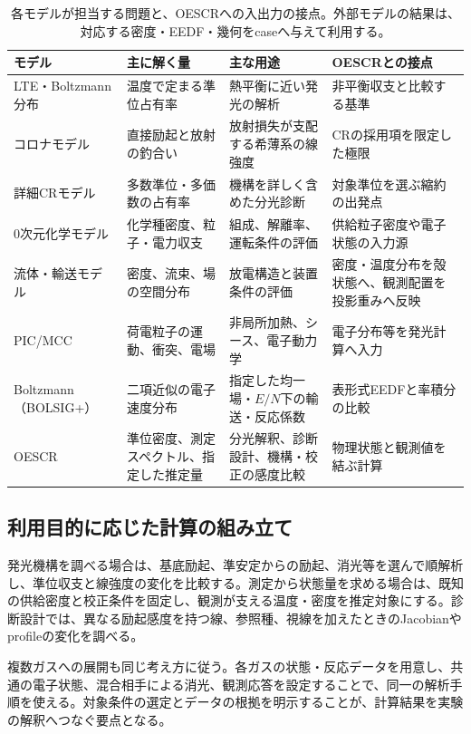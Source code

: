 \begin{table}[htbp]
\centering\small
\begin{tabularx}{\linewidth}{p{26mm}YYY}
\toprule
モデル & 主に解く量 & 主な用途 & OESCRとの接点 \\
\midrule
LTE・Boltzmann分布 & 温度で定まる準位占有率 & 熱平衡に近い発光の解析 & 非平衡収支と比較する基準 \\
コロナモデル & 直接励起と放射の釣合い & 放射損失が支配する希薄系の線強度 & CRの採用項を限定した極限 \\
詳細CRモデル & 多数準位・多価数の占有率 & 機構を詳しく含めた分光診断 & 対象準位を選ぶ縮約の出発点 \\
0次元化学モデル & 化学種密度、粒子・電力収支 & 組成、解離率、運転条件の評価 & 供給粒子密度や電子状態の入力源 \\
流体・輸送モデル & 密度、流束、場の空間分布 & 放電構造と装置条件の評価 & 密度・温度分布を殻状態へ、観測配置を投影重みへ反映 \\
PIC/MCC & 荷電粒子の運動、衝突、電場 & 非局所加熱、シース、電子動力学 & 電子分布等を発光計算へ入力 \\
Boltzmann（BOLSIG+） & 二項近似の電子速度分布 & 指定した均一場・$E/N$下の輸送・反応係数 & 表形式EEDFと率積分の比較 \\
OESCR & 準位密度、測定スペクトル、指定した推定量 & 分光解釈、診断設計、機構・校正の感度比較 & 物理状態と観測値を結ぶ計算 \\
\bottomrule
\end{tabularx}
\caption{各モデルが担当する問題と、OESCRへの入出力の接点\cite{fujimoto,lieberman,hagelaar,arellano}。外部モデルの結果は、対応する密度・EEDF・幾何をcaseへ与えて利用する。}
\label{tab:models}
\end{table}

\subsection{利用目的に応じた計算の組み立て}
発光機構を調べる場合は、基底励起、準安定からの励起、消光等を選んで順解析し、準位収支と線強度の変化を比較する。測定から状態量を求める場合は、既知の供給密度と校正条件を固定し、観測が支える温度・密度を推定対象にする。診断設計では、異なる励起感度を持つ線、参照種、視線を加えたときのJacobianやprofileの変化を調べる。

複数ガスへの展開も同じ考え方に従う。各ガスの状態・反応データを用意し、共通の電子状態、混合相手による消光、観測応答を設定することで、同一の解析手順を使える。対象条件の選定とデータの根拠を明示することが、計算結果を実験の解釈へつなぐ要点となる。
